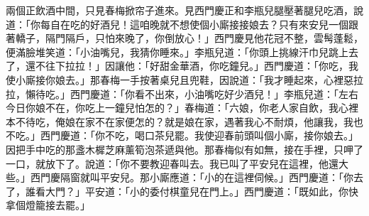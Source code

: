 兩個正飲酒中間，只見春梅掀帘子進來。見西門慶正和李瓶兒腿壓著腿兒吃酒，說道：「你每自在吃的好酒兒！這咱晚就不想使個小廝接接娘去？只有來安兒一個跟著轎子，隔門隔戶，只怕來晚了，你倒放心！」西門慶見他花冠不整，雲髩蓬鬆，便滿臉堆笑道：「小油嘴兒，我猜你睡來。」李瓶兒道：「你頭上挑線汗巾兒跳上去了，還不往下拉拉！」因讓他：「好甜金華酒，你吃鐘兒。」西門慶道：「你吃，我使小廝接你娘去。」那春梅一手按著桌兒且兜鞋，因說道：「我才睡起來，心裡惡拉拉，懶待吃。」西門慶道：「你看不出來，小油嘴吃好少酒兒！」李瓶兒道：「左右今日你娘不在，你吃上一鐘兒怕怎的？」春梅道：「六娘，你老人家自飲，我心裡本不待吃，俺娘在家不在家便怎的？就是娘在家，遇著我心不耐煩，他讓我，我也不吃。」西門慶道：「你不吃，喝口茶兒罷。我使迎春前頭叫個小廝，接你娘去。」因把手中吃的那盞木樨芝麻薰筍泡茶遞與他。那春梅似有如無，接在手裡，只呷了一口，就放下了。說道：「你不要教迎春叫去。我已叫了平安兒在這裡，他還大些。」西門慶隔窗就叫平安兒。那小廝應道：「小的在這裡伺候。」西門慶道：「你去了，誰看大門？」平安道：「小的委付棋童兒在門上。」西門慶道：「既如此，你快拿個燈籠接去罷。」

